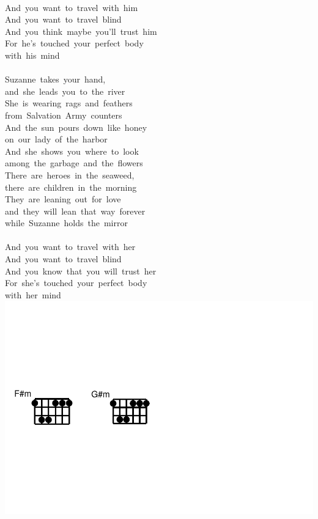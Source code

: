 \documentclass[]{book}
\begin{document}
~\\
And~you~want~to~travel~with~him\\
And~you~want~to~travel~blind\\
And~you~think~maybe~you'll~trust~him\\
For~he's~touched~your~perfect~body~\\
with~his~mind\\
~\\
Suzanne~takes~your~hand,\\
and~she~leads~you~to~the~river~~~\\
She~is~wearing~rags~and~feathers\\
from~Salvation~Army~counters\\
And~the~sun~pours~down~like~honey\\
on~our~lady~of~the~harbor\\
And~she~shows~you~where~to~look~\\
among~the~garbage~and~the~flowers\\
There~are~heroes~in~the~seaweed,~\\
there~are~children~in~the~morning~~~~\\
They~are~leaning~out~for~love~\\
and~they~will~lean~that~way~forever~~~\\
while~Suzanne~holds~the~mirror\\
~\\
And~you~want~to~travel~with~her\\
And~you~want~to~travel~blind\\
And~you~know~that~you~will~trust~her\\
For~she's~touched~your~perfect~body~\\
with~her~mind~\\

\includegraphics{Songs_files/figure-latex/unnamed-chunk-9-1.pdf}
\end{document}
